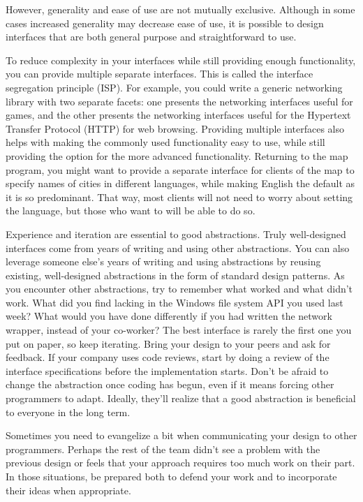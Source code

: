 However, generality and ease of use are not mutually exclusive. Although in some cases increased generality may decrease ease of use, it is possible to design interfaces that are both general purpose and straightforward to use.

To reduce complexity in your interfaces while still providing enough functionality, you can provide multiple separate interfaces. This is called the interface segregation principle (ISP). For example, you could write a generic networking library with two separate facets: one presents the networking interfaces useful for games, and the other presents the networking interfaces useful for the Hypertext Transfer Protocol (HTTP) for web browsing. Providing multiple interfaces also helps with making the commonly used functionality easy to use, while still providing the option for the more advanced functionality. Returning to the map program, you might want to provide a separate interface for clients of the map to specify names of cities in different languages, while making English the default as it is so predominant. That way, most clients will not need to worry about setting the language, but those who want to will be able to do so.


Experience and iteration are essential to good abstractions. Truly well-designed interfaces come from years of writing and using other abstractions. You can also leverage someone else’s years of writing and using abstractions by reusing existing, well-designed abstractions in the form of standard design patterns. As you encounter other abstractions, try to remember what worked and what didn’t work. What did you find lacking in the Windows file system API you used last week? What would you have done differently if you had written the network wrapper, instead of your co-worker? The best interface is rarely the first one you put on paper, so keep iterating. Bring your design to your peers and ask for feedback. If your company uses code reviews, start by doing a review of the interface specifications before the implementation starts. Don’t be afraid to change the abstraction once coding has begun, even if it means forcing other programmers to adapt. Ideally, they’ll realize that a good abstraction is beneficial to everyone in the long term.

Sometimes you need to evangelize a bit when communicating your design to other programmers. Perhaps the rest of the team didn’t see a problem with the previous design or feels that your approach requires too much work on their part. In those situations, be prepared both to defend your work and to incorporate their ideas when appropriate.

